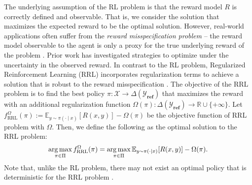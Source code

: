 
The underlying assumption of the RL problem is that the reward model $R$ is correctly defined and observable. That is, we consider the solution that maximizes the expected reward to be the optimal solution. 
However, real-world applications often suffer from the \textit{reward misspecification problem} -- the reward model observable to the agent is only a proxy for the true underlying reward of the problem \citep{ortega2014adversarial,husain2021regularized,NEURIPS2021_bb1443cc,eysenbach2022maximum,pan2022the,NEURIPS2021_bb1443cc}.
Prior work has investigated strategies to optimize under the uncertainty in the observed reward.
In contrast to the RL problem, Regularized Reinforcement Learning (RRL) incorporates regularization terms to achieve a solution that is robust to the reward misspecification \citep{neu2017unified,pmlr-v97-geist19a, NEURIPS2019_3f4366ae,NEURIPS2021_bb1443cc}. 
The objective of the RRL problem is to find the best policy $\pi: \mathcal{X} \rightarrow \Delta(\mathcal{Y}_\textbf{ref})$ that maximizes the reward with an additional regularization function $\Omega (\pi): \Delta(\mathcal{Y}_\textbf{ref}) \rightarrow \mathbb{R} \cup\{+\infty\} $. Let $f_\textrm{RRL}^{\Omega}(\pi) := \mathbb{E}_{y \sim \pi(\cdot \mid x)}[R (x,y)]- \Omega(\pi)$ be the objective function of RRL problem with $\Omega$. Then, we define the following as the optimal solution to the RRL problem:
\begin{equation}
\operatorname*{arg\,max}_{\pi \in \Pi} f_\textrm{RRL}^{\Omega}(\pi)=\operatorname*{arg\,max}_{\pi \in \Pi}\mathbb{E}_{y \sim \pi(\cdot \mid x)}[R (x,y)] - \Omega(\pi). \label{eq:rrl} 
\end{equation}
Note that, unlike the RL problem, there may not exist an optimal policy that is deterministic for the RRL problem \citep{pmlr-v97-geist19a}. %
